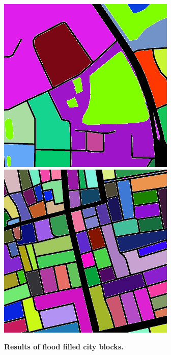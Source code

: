 \documentclass{article}
\begin{document}
\begin{figure}
    \centering    
\includegraphics[scale=0.3]{Images/city82-745994-result.png}  
\includegraphics[scale=0.3]{Images/city1667-82612-result.png}
\caption{\bf Results of flood filled city blocks.}    
 \label{fig:floodfilled}  
\end{figure} 
\end{document}
